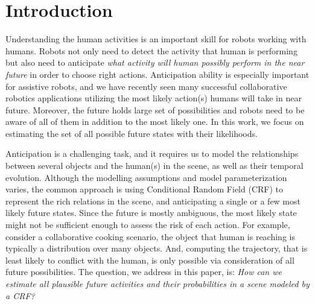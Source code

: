 \section{Introduction}
\label{intro}
Understanding the human activities is an important skill for robots working with humans. Robots not only need to detect the activity that human is performing but also need to anticipate \emph{what activity will human possibly perform in the near future} in order to choose right actions. Anticipation ability is especially important for assistive robots, and we have recently seen many successful collaborative robotics applications \cite{collob1,collob2,hemaISER} utilizing the most likely action(s) humans will take in near future. Moreover, the future holds large set of possibilities and robots need to be aware of all of them in addition to the most likely one. In this work, we focus on estimating the set of all possible future states with their likelihoods.


Anticipation is a challenging task, and it requires us to model the relationships between several objects and the human(s) in the scene, as well as their temporal evolution. Although the modelling assumptions and model parameterization varies, the common approach \cite{hemaAnt,gpcrf,hemaECCV,tian} is using Conditional Random Field (CRF) to represent the rich relations in the scene, and anticipating a single or a few most likely future states. Since the future is mostly ambiguous, the most likely state might not be sufficient enough to assess the risk of each action. For example, consider a collaborative cooking scenario, the object that human is reaching is typically a distribution over many objects. And, computing the trajectory, that is least likely to conflict with the human, is only possible via consideration of all future possibilities. The question, we address in this paper, is: \emph{How can we estimate all plausible future activities and their probabilities in a scene modeled by a CRF?}



